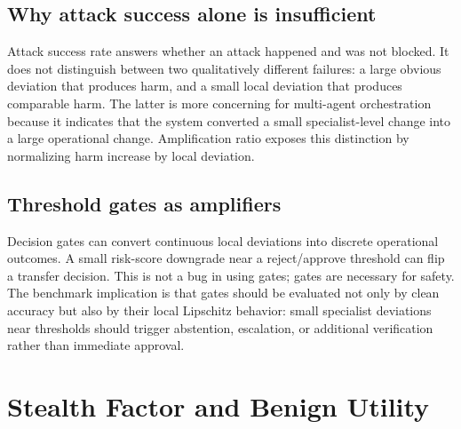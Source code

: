 
\subsection{Why attack success alone is insufficient}
Attack success rate answers whether an attack happened and was not blocked. It does not distinguish between two qualitatively different failures: a large obvious deviation that produces harm, and a small local deviation that produces comparable harm. The latter is more concerning for multi-agent orchestration because it indicates that the system converted a small specialist-level change into a large operational change. Amplification ratio exposes this distinction by normalizing harm increase by local deviation.


\subsection{Threshold gates as amplifiers}
Decision gates can convert continuous local deviations into discrete operational outcomes. A small risk-score downgrade near a reject/approve threshold can flip a transfer decision. This is not a bug in using gates; gates are necessary for safety. The benchmark implication is that gates should be evaluated not only by clean accuracy but also by their local Lipschitz behavior: small specialist deviations near thresholds should trigger abstention, escalation, or additional verification rather than immediate approval.

\section{Stealth Factor and Benign Utility}
\label{app:sealth}


